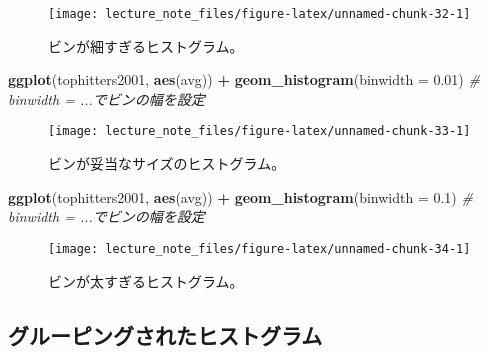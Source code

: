 \documentclass[]{book}
\newenvironment{Shaded}{\begin{snugshade}}{\end{snugshade}}
\newcommand{\KeywordTok}[1]{\textcolor[rgb]{0.13,0.29,0.53}{\textbf{#1}}}
\newcommand{\DataTypeTok}[1]{\textcolor[rgb]{0.13,0.29,0.53}{#1}}
\newcommand{\FloatTok}[1]{\textcolor[rgb]{0.00,0.00,0.81}{#1}}
\newcommand{\StringTok}[1]{\textcolor[rgb]{0.31,0.60,0.02}{#1}}
\newcommand{\CommentTok}[1]{\textcolor[rgb]{0.56,0.35,0.01}{\textit{#1}}}
\newcommand{\OperatorTok}[1]{\textcolor[rgb]{0.81,0.36,0.00}{\textbf{#1}}}
\newcommand{\NormalTok}[1]{#1}
\begin{document}
\begin{figure}

{\centering \texttt{[image: lecture\_note\_files/figure-latex/unnamed-chunk-32-1]} 

}

\caption{ビンが細すぎるヒストグラム。}\label{fig:unnamed-chunk-32}
\end{figure}



\begin{Shaded}
\begin{Highlighting}[]
\KeywordTok{ggplot}\NormalTok{(tophitters2001, }\KeywordTok{aes}\NormalTok{(avg)) }\OperatorTok{+}
\StringTok{  }\KeywordTok{geom_histogram}\NormalTok{(}\DataTypeTok{binwidth =} \FloatTok{0.01}\NormalTok{) }\CommentTok{# binwidth = ...でビンの幅を設定}
\end{Highlighting}
\end{Shaded}

\begin{figure}

{\centering \texttt{[image: lecture\_note\_files/figure-latex/unnamed-chunk-33-1]} 

}

\caption{ビンが妥当なサイズのヒストグラム。}\label{fig:unnamed-chunk-33}
\end{figure}



\begin{Shaded}
\begin{Highlighting}[]
\KeywordTok{ggplot}\NormalTok{(tophitters2001, }\KeywordTok{aes}\NormalTok{(avg)) }\OperatorTok{+}
\StringTok{  }\KeywordTok{geom_histogram}\NormalTok{(}\DataTypeTok{binwidth =} \FloatTok{0.1}\NormalTok{) }\CommentTok{# binwidth = ...でビンの幅を設定}
\end{Highlighting}
\end{Shaded}

\begin{figure}

{\centering \texttt{[image: lecture\_note\_files/figure-latex/unnamed-chunk-34-1]} 

}

\caption{ビンが太すぎるヒストグラム。}\label{fig:unnamed-chunk-34}
\end{figure}

\subsection{グルーピングされたヒストグラム}
\end{document}
